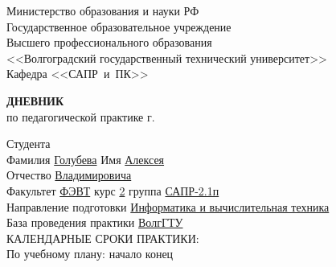 \documentclass[a4paper, 14pt]{extreport}
\begin{document}
    \begin{titlepage}
        \begin{center}
            Министерство образования и науки РФ \\
            Государственное образовательное учреждение\\
            Высшего профессионального образования\\
            <<Волгоградский государственный технический университет>>\\
            Кафедра <<САПР~и~ПК>>
        \end{center}
        \vspace{2cm}
        \begin{center}
            \large \textbf{ДНЕВНИК} \\
            по педагогической практике \the\year г.
        \end{center}
        \begin{flushleft}
            Студента\\
            Фамилия \underline{Голубева\hspace{3.1cm}} 
            Имя \underline{Алексея\hspace{2.1cm}}\\
            Отчество \underline{Владимировича\hspace{1.6cm}}\\
            Факультет \underline{ФЭВТ\hspace{3.45cm}} курс \underline{2\hspace{1.5cm}} 
            группа \underline{САПР-2.1п\hspace{2.6cm}}\\
            \vspace{1cm}
            Направление подготовки \underline{Информатика и вычислительная техника\hspace{2.6cm}}\\
            \underline{\hspace{\textwidth}}
            База проведения практики \underline{ВолгГТУ\hspace{9.1cm}}\\
            \underline{\hspace{\textwidth}}\vspace{1cm}
            КАЛЕНДАРНЫЕ СРОКИ ПРАКТИКИ:\\
            По учебному плану: \hspace{0.2cm} начало \underline{\hspace{4.5cm}} 
            конец \underline{\hspace{4.5cm}}\\

\end{flushleft}
\end{titlepage}
\end{document}
